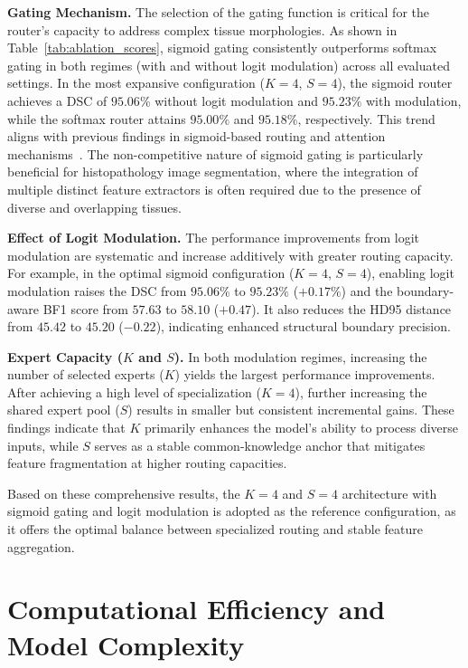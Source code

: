 \noindent\textbf{Gating Mechanism.} The selection of the gating function is critical for the router's capacity to address complex tissue morphologies. As shown in Table~\ref{tab:ablation_scores}, sigmoid gating consistently outperforms softmax gating in both regimes (with and without logit modulation) across all evaluated settings. In the most expansive configuration ($K=4$, $S=4$), the sigmoid router achieves a DSC of $95.06\%$ without logit modulation and $95.23\%$ with modulation, while the softmax router attains $95.00\%$ and $95.18\%$, respectively. This trend aligns with previous findings in sigmoid-based routing and attention mechanisms~\cite{sigmoidGatingMoE, sigmoid_attention}. The non-competitive nature of sigmoid gating is particularly beneficial for histopathology image segmentation, where the integration of multiple distinct feature extractors is often required due to the presence of diverse and overlapping tissues.

\noindent\textbf{Effect of Logit Modulation.} The performance improvements from logit modulation are systematic and increase additively with greater routing capacity. For example, in the optimal sigmoid configuration ($K=4$, $S=4$), enabling logit modulation raises the DSC from $95.06\%$ to $95.23\%$ ($+0.17\%$) and the boundary-aware BF1 score from $57.63$ to $58.10$ ($+0.47$). It also reduces the HD95 distance from $45.42$ to $45.20$ ($-0.22$), indicating enhanced structural boundary precision.

\noindent\textbf{Expert Capacity ($K$ and $S$).} In both modulation regimes, increasing the number of selected experts ($K$) yields the largest performance improvements. After achieving a high level of specialization ($K=4$), further increasing the shared expert pool ($S$) results in smaller but consistent incremental gains. These findings indicate that $K$ primarily enhances the model's ability to process diverse inputs, while $S$ serves as a stable common-knowledge anchor that mitigates feature fragmentation at higher routing capacities.

Based on these comprehensive results, the $K=4$ and $S=4$ architecture with sigmoid gating and logit modulation is adopted as the reference configuration, as it offers the optimal balance between specialized routing and stable feature aggregation.

\section{Computational Efficiency and Model Complexity}
\label{sec:complexity}

